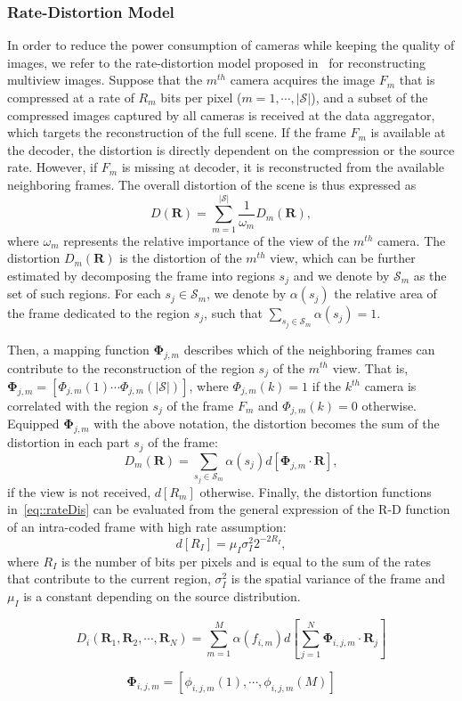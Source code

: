 \subsubsection{Rate-Distortion Model}
\label{sec::rateDistortion}
In order to reduce the power consumption of cameras while keeping the quality of images,
we refer to the rate-distortion model proposed in~\cite{CorrAwareScheduling} for
reconstructing multiview images.
Suppose that the $m^{th}$ camera acquires the image $F_{m}$ that is compressed at a
rate of $R_{m}$ bits per pixel ($m=1,\cdots,|\mathcal{S}|$), and a subset of the compressed images
captured by all cameras is received at the data aggregator, which targets the
reconstruction of the full scene.
If the frame $F_{m}$ is available at the decoder, the distortion is directly dependent on the compression or the source rate.
However, if $F_{m}$ is missing at decoder, it is reconstructed from the available neighboring frames.
The overall distortion of the scene is thus expressed as
\begin{equation}
D(\mathbf{R}) = \sum_{m=1}^{|\mathcal{S}|} \frac{1}{\omega_m} D_{m}(\mathbf{R}),
\end{equation}
where $\omega_m$ represents the relative importance of the view of the $m^{th}$ camera.
The distortion $D_{m}(\mathbf{R})$ is the distortion of the $m^{th}$ view, which can be
further estimated by decomposing the frame into regions $s_j$ and we denote by
$\mathcal{S}_{m}$ as the set of such regions.
For each $s_j \in \mathcal{S}_{m}$, we denote by $\alpha (s_j)$ the relative area of the
frame dedicated to the region $s_j$, such that
${\sum_{s_j \in \mathcal{S}_{m}} \alpha (s_j) = 1}$.

Then, a mapping function $\mathbf{\Phi}_{j,m}$ describes which of the neighboring frames can contribute to the reconstruction of the region $s_j$ of the $m^{th}$ view.
That is, ${\mathbf{\Phi}_{j,m} = [\Phi_{j,m}(1) \cdots \Phi_{j,m}(|\mathcal{S}|)]}$, where ${\Phi_{j,m}(k) = 1}$ if the $k^{th}$ camera is correlated with the region $s_j$ of the frame $F_{m}$ and ${\Phi_{j,m}(k) = 0}$ otherwise.
Equipped $\mathbf{\Phi}_{j,m}$ with the above notation, the distortion becomes the sum of the distortion in each part $s_j$ of the frame:
\begin{equation}
D_{m}(\mathbf{R}) = \sum_{s_j \in \mathcal{S}_{m}} \alpha (s_j) d[\mathbf{\Phi}_{j,m} \cdot \mathbf{R}],
\label{eq::rateDis}
\end{equation}
if the view is not received, $d[R_{m}]$ otherwise.
Finally, the distortion functions in~\eqref{eq::rateDis} can be evaluated from the general expression of the R-D function of an intra-coded frame with high rate assumption:
\begin{equation}
d[R_I] = \mu_I \sigma_I^2 2^{-2R_I},
\end{equation}
where $R_I$ is the number of bits per pixels and is equal to the sum of the rates that contribute to the current region, $\sigma_I^2$ is the spatial variance of the frame and $\mu_I$ is a constant depending on the source distribution.

\begin{equation}
D_i (\mathbf{R}_1,\mathbf{R}_2,\cdots,\mathbf{R}_N) = \sum_{m=1}^{M} \alpha(f_{i,m}) d[ \sum_{j=1}^N \mathbf{\Phi}_{i,j,m}\cdot \mathbf{R}_j ]
\end{equation}

\begin{equation}
\mathbf{\Phi}_{i,j,m} = [\phi_{i,j,m}(1),\cdots,\phi_{i,j,m}(M)]
\end{equation}